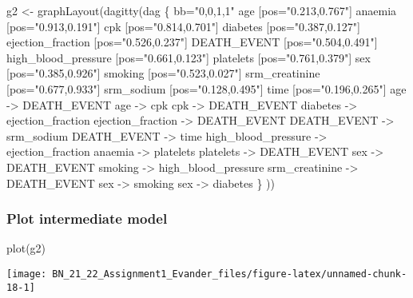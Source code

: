 \documentclass[
]{article}
\newenvironment{Shaded}{\begin{snugshade}}{\end{snugshade}}
\newcommand{\FunctionTok}[1]{\textcolor[rgb]{0.00,0.00,0.00}{#1}}
\newcommand{\NormalTok}[1]{#1}
\newcommand{\OtherTok}[1]{\textcolor[rgb]{0.56,0.35,0.01}{#1}}
\newcommand{\StringTok}[1]{\textcolor[rgb]{0.31,0.60,0.02}{#1}}
\begin{document}
\begin{Shaded}
\begin{Highlighting}[]
\NormalTok{g2 }\OtherTok{\textless{}{-}} \FunctionTok{graphLayout}\NormalTok{(}\FunctionTok{dagitty}\NormalTok{(}\StringTok{\textquotesingle{}dag \{}
\StringTok{bb="0,0,1,1"}
\StringTok{age [pos="0.213,0.767"]}
\StringTok{anaemia [pos="0.913,0.191"]}
\StringTok{cpk [pos="0.814,0.701"]}
\StringTok{diabetes [pos="0.387,0.127"]}
\StringTok{ejection\_fraction [pos="0.526,0.237"]}
\StringTok{DEATH\_EVENT [pos="0.504,0.491"]}
\StringTok{high\_blood\_pressure [pos="0.661,0.123"]}
\StringTok{platelets [pos="0.761,0.379"]}
\StringTok{sex [pos="0.385,0.926"]}
\StringTok{smoking [pos="0.523,0.027"]}
\StringTok{srm\_creatinine [pos="0.677,0.933"]}
\StringTok{srm\_sodium [pos="0.128,0.495"]}
\StringTok{time [pos="0.196,0.265"]}
\StringTok{age {-}\textgreater{} DEATH\_EVENT}
\StringTok{age {-}\textgreater{} cpk}
\StringTok{cpk {-}\textgreater{} DEATH\_EVENT}
\StringTok{diabetes {-}\textgreater{} ejection\_fraction}
\StringTok{ejection\_fraction {-}\textgreater{} DEATH\_EVENT}
\StringTok{DEATH\_EVENT {-}\textgreater{} srm\_sodium}
\StringTok{DEATH\_EVENT {-}\textgreater{} time}
\StringTok{high\_blood\_pressure {-}\textgreater{} ejection\_fraction}
\StringTok{anaemia {-}\textgreater{} platelets}
\StringTok{platelets {-}\textgreater{} DEATH\_EVENT}
\StringTok{sex {-}\textgreater{} DEATH\_EVENT}
\StringTok{smoking {-}\textgreater{} high\_blood\_pressure}
\StringTok{srm\_creatinine {-}\textgreater{} DEATH\_EVENT}
\StringTok{sex {-}\textgreater{} smoking}
\StringTok{sex {-}\textgreater{} diabetes}
\StringTok{\}}
\StringTok{\textquotesingle{}}\NormalTok{))}
\end{Highlighting}
\end{Shaded}

\normalsize

\hypertarget{plot-intermediate-model}{%
\subsubsection{Plot intermediate model}\label{plot-intermediate-model}}

\begin{Shaded}
\begin{Highlighting}[]
\FunctionTok{plot}\NormalTok{(g2)}
\end{Highlighting}
\end{Shaded}

\begin{center}\texttt{[image: BN\_21\_22\_Assignment1\_Evander\_files/figure-latex/unnamed-chunk-18-1]} \end{center}
\newpage
\end{document}
